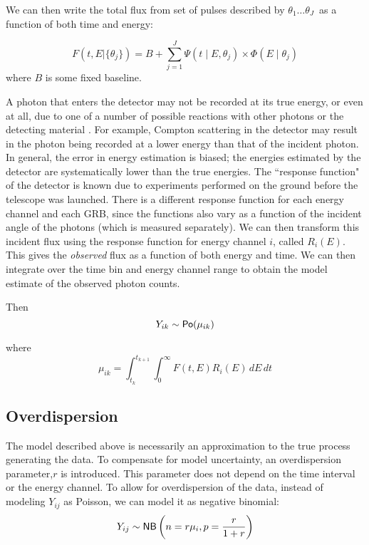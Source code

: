 \documentclass[12pt,letterpaper]{article}
\begin{document}
We can then write the total flux from set of pulses described by $\theta_1 \dots \theta_J$\ as a function of both time and energy:

\begin{equation} F(t,E| \{\theta_j\} ) = B + \sum_{j = 1}^J \Psi(t \mid E, \theta_j) \times \Phi(E \mid \theta_j) \end{equation}
where $B$ is some fixed baseline. 

A photon that enters the detector may not be recorded at its true energy, or even at all, due to one of a number of possible reactions with other photons or the detecting material \citet{Lore:Epst:1989}. For example, Compton scattering in the detector may result in the photon being recorded at a lower energy than that of the incident photon. In general, the error in energy estimation is biased; the energies estimated by the detector are systematically lower than the true energies.    The ``response function" of the detector is known due to experiments performed on the ground before the telescope was launched. There is a different response function for each energy channel and each GRB, since the functions also vary as a function of the incident angle of the photons (which is measured separately). We can then transform this incident flux using the response function for  energy channel $i$, called $R_i(E)$. This gives the \emph{observed} flux as a function of both energy and time. We can then integrate over the time bin and energy channel range to obtain the model estimate of the observed photon counts.

Then \[Y_{ik} \sim \mathsf{Po}(\mu_{ik}) \]

where \[\mu_{ik} = \int_{t_{k}}^{t_{k+1}} \int_0^{\infty} F(t,E) R_i(E) \,dE \,dt \]



        
\subsection{Overdispersion}
The model described above is necessarily an approximation to the true process generating the data.  To compensate for model uncertainty, an overdispersion parameter,$r$ is introduced. This parameter does not depend on the time interval or the energy channel. To allow for overdispersion of the data, instead of modeling $Y_{ij}$ as Poisson, we can model it as negative binomial:
\[ Y_{ij} \sim \mathsf{NB} \left(n = r\mu_i , p = \frac{r}{1+r} \right)\]
\end{document}
